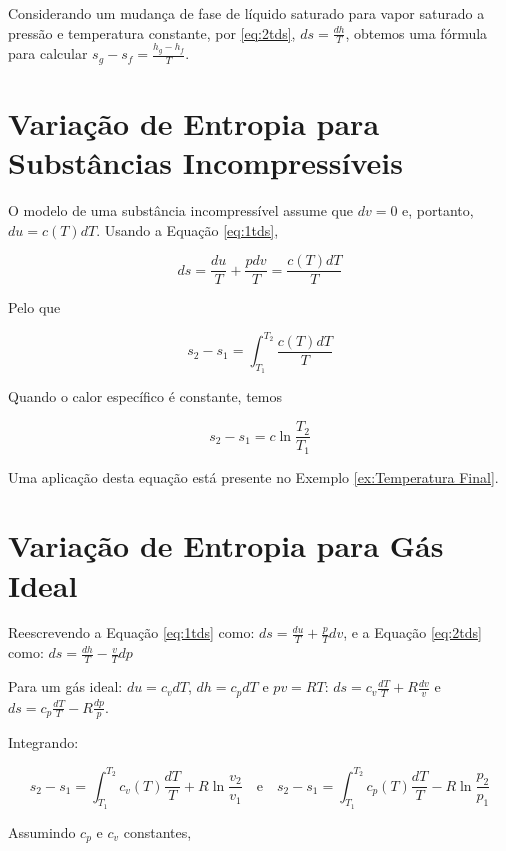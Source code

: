 Considerando um mudança de fase de líquido saturado para vapor saturado a pressão e temperatura constante, por \ref{eq:2tds}, $ds = \frac{dh}{T}$, obtemos uma fórmula para calcular $s_g - s_f = \frac{h_g - h_f}{T}$.

\section{Variação de Entropia para Substâncias Incompressíveis}

O modelo de uma substância incompressível assume que $dv = 0$ e, portanto, $du = c(T) dT$. Usando a Equação \ref{eq:1tds}, 

\begin{equation*}
    ds = \frac{du}{T} + \frac{p dv}{T} = \frac{c(T) dT}{T}
\end{equation*}

Pelo que

\begin{equation*}
    s_2 - s_1 = \int_{T_1}^{T_2} \frac{c(T) dT}{T}
\end{equation*}

Quando o calor específico é constante, temos

\begin{equation*}
    s_2 - s_1 = c \ln \frac{T_2}{T_1}
\end{equation*}

Uma aplicação desta equação está presente no Exemplo \ref{ex:Temperatura Final}.

\section{Variação de Entropia para Gás Ideal}

Reescrevendo a Equação \ref{eq:1tds} como: $ds = \frac{du}{T} + \frac{p}{T} dv$, e a Equação \ref{eq:2tds} como: $ds = \frac{dh}{T} - \frac{v}{T} dp$

Para um gás ideal: $du = c_v dT$, $dh = c_p dT$ e $pv = RT$: $ds = c_v \frac{dT}{T} + R\frac{dv}{v}$ e $ds = c_p \frac{dT}{T} - R\frac{dp}{p}$.

Integrando:

\begin{equation} \label{eq:gas-int}
    s_2 - s_1 = \int_{T_1}^{T_2} c_v (T) \frac{dT}{T} + R \ln \frac{v_2}{v_1} \quad \text{e} \quad s_2 - s_1 = \int_{T_1}^{T_2} c_p (T) \frac{dT}{T} - R \ln \frac{p_2}{p_1}
\end{equation}

Assumindo $c_p$ e $c_v$ constantes,

